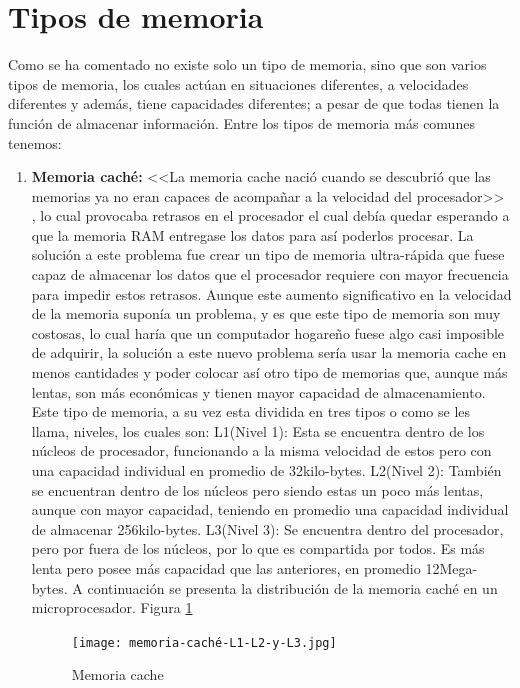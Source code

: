 \documentclass{article}
\begin{document}
\section{Tipos de memoria} \label{contenido}
Como se ha comentado no existe solo un tipo de memoria, sino que son varios tipos de memoria, los cuales actúan en situaciones diferentes, a velocidades diferentes y además, tiene capacidades diferentes; a pesar de que todas tienen la función de almacenar información. 
Entre los tipos de memoria más comunes tenemos:
\begin{enumerate}
\item \textbf{Memoria caché:} <<La memoria cache nació cuando se descubrió que las memorias ya no eran capaces de acompañar a la velocidad del procesador>> \cite{tipos-memoria}, lo cual provocaba retrasos en el procesador el cual debía quedar esperando a que la memoria RAM entregase los datos para así poderlos procesar. La solución a este problema fue crear un tipo de memoria ultra-rápida que fuese capaz de almacenar los datos que el procesador requiere con mayor frecuencia para impedir estos retrasos.
Aunque este aumento significativo en la velocidad de la memoria suponía un problema, y es que este tipo de memoria son muy costosas, lo cual haría que un computador hogareño fuese algo casi imposible de adquirir, la solución a este nuevo problema sería usar la memoria cache en menos cantidades y poder colocar así otro tipo de memorias que, aunque más lentas, son más económicas y tienen mayor capacidad de almacenamiento. 
Este tipo de memoria, a su vez esta dividida en tres tipos o como se les llama, niveles, los cuales son:
\subitem L1(Nivel 1): Esta se encuentra dentro de los núcleos de procesador, funcionando a la misma velocidad de estos pero con una capacidad individual en promedio de 32kilo-bytes.
\subitem L2(Nivel 2): También se encuentran dentro de los núcleos pero siendo estas un poco más lentas, aunque con mayor capacidad, teniendo en promedio una capacidad individual de almacenar 256kilo-bytes.
\subitem L3(Nivel 3): Se encuentra dentro del procesador, pero por fuera de los núcleos, por lo que es compartida por todos. Es más lenta pero posee más capacidad que las anteriores, en promedio 12Mega-bytes. A continuación se presenta la distribución de la memoria caché en un microprocesador. Figura \ref{fig:memoriacachel}
    \begin{figure}[h]
        \centering
        \texttt{[image: memoria-caché-L1-L2-y-L3.jpg]}
        \caption{Memoria cache}
        \label{fig:memoriacachel}
    \end{figure}



\end{enumerate}
\end{document}
